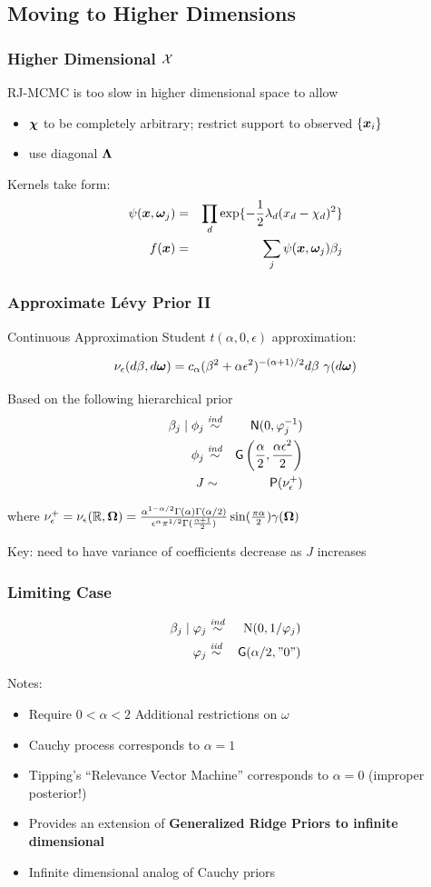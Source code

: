 \documentclass[]{beamer}
\newcommand{\bs}[2]{\begin{frame} \frametitle{#1}
{#2}
\end{frame} }
\begin{document}
\subsection{Moving to Higher Dimensions}


\bs{Higher Dimensional $\mathcal{X}$} {

RJ-MCMC is too slow in higher dimensional space to allow \pause
\begin{itemize}
\item $\bm \chi$ to be completely arbitrary; restrict support to
  observed $\{\bm x_i\}$  \pause
\item use diagonal $\bm \Lambda$
\end{itemize}
Kernels take form:
\begin{eqnarray*}
\psi(\bm x, \bm \omega_j) & = & \prod_d \exp\{ -\frac{1}{2} \lambda_d (x_d - \chi_{d})^2
\} \\
f(\bm x) & =  & \sum_j \psi(\bm x, \bm \omega_j) \beta_j
\end{eqnarray*}
}


\bs{Approximate L\'evy Prior II} {
Continuous Approximation Student $t(\alpha, 0, \epsilon)$ approximation:

$$\nu_\epsilon(d\beta, d \bm \omega) = c_\alpha (\beta^2 + \alpha
\epsilon^2)^{-(\alpha + 1)/2} d\beta \ \gamma(d \bm \omega) $$

\pause

Based on the following hierarchical prior
\begin{eqnarray*}
  \beta_j \mid \phi_j & \mathrel{\mathop{\sim}\limits^{\mathit{ind}}} & \textsf{N}(0,  \varphi_j^{-1}) \\
  \phi_j    & \mathrel{\mathop{\sim}\limits^{\mathit{ind}}} & \mbox{\sf G}\left(\frac{\alpha}{2}, \frac{\alpha \epsilon^2}{2}\right) \\
   J & \sim & \mbox{\sf P}(\nu^+_\epsilon)
\end{eqnarray*}

where $\nu^+_\epsilon = \nu_\epsilon(\mathbb{R}, \bm \Omega) = \frac{\alpha ^{1
    - \alpha/2} \Gamma(\alpha)\Gamma(\alpha/2)}{\epsilon^\alpha
  \pi^{1/2} \Gamma(\frac{\alpha +1}{2})} \sin(\frac{\pi \alpha} {2}) \gamma(\bm \Omega)$

Key:  need to have variance of coefficients decrease as $J$ increases
}

\bs{Limiting Case} {
  \begin{eqnarray*}
    \beta_j   \mid  \varphi_j & \mathrel{\mathop{\sim}\limits^{\mathit{ind}}} &\mbox{\rm N}(0, 1/\varphi_j) \\
      \varphi_j & \mathrel{\mathop{\sim}\limits^{\mathit{iid}}} & \mbox{\sf G}(\alpha/2, "0")
  \end{eqnarray*}
\pause

Notes:
  \begin{itemize}
\item Require $0 < \alpha < 2$  Additional restrictions  on $\omega$  \pause
\item  Cauchy process corresponds to $\alpha = 1$ \pause
\item  Tipping's ``Relevance Vector Machine'' corresponds to $\alpha =
  0$  (improper posterior!) \pause
\item Provides an extension of \bf{Generalized Ridge Priors}
      to infinite dimensional \pause
\item Infinite dimensional analog of Cauchy priors
 \end{itemize}
}
\end{document}
